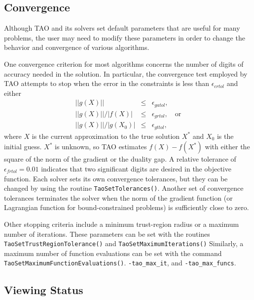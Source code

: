 \documentclass[]{book}
\begin{document}
\subsection{Convergence}\label{sec_customize}

Although TAO and its solvers set default parameters that are useful
for many problems, the user may need to modify these
parameters in order to change the behavior and convergence of various algorithms.

One convergence criterion for most algorithms concerns the number
of digits of accuracy needed in the solution.  In particular,
the convergence test employed by TAO attempts to stop when
the error in the constraints is less than $\epsilon_{crtol}$
and either
\[
\begin{array}{lcl}
||g(X)|| &\leq& \epsilon_{gatol}, \\
||g(X)||/|f(X)| &\leq& \epsilon_{grtol}, \quad \mbox{or} \\
||g(X)||/|g(X_0)| &\leq& \epsilon_{gttol},
\end{array}
\]
where $X$ is the current approximation to the true solution $X^*$
and $X_0$ is the initial guess.
$X^*$ is unknown, so TAO estimates $f(X) - f(X^*)$ with either 
the square of the norm of the gradient or the duality gap.
A relative tolerance of $\epsilon_{frtol}=0.01$ indicates that two
significant digits are desired in the objective function.
Each solver sets its own  convergence tolerances, but they can
be changed by using the routine
{\tt TaoSetTolerances()}.
Another set of convergence tolerances 
terminates the solver when the norm of the gradient function
(or Lagrangian function for bound-constrained problems)
is sufficiently close to zero.

Other stopping criteria include a minimum trust-region radius or 
a maximum number of iterations.  These parameters can be set with
the routines {\tt Tao\-Set\-Trust\-Region\-Tolerance()} %
and {\tt Tao\-Set\-Max\-imum\-Iter\-ations()}%
Similarly, a maximum number of function evaluations can be set 
with the command 
{\tt Tao\-Set\-Max\-imum\-Func\-tion\-Evaluations()}.
\texttt{-tao\_max\_it}, and \texttt{-tao\_max\_funcs}.

\subsection{Viewing Status}
\end{document}
